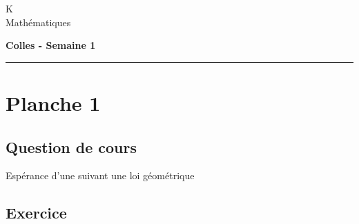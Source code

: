 \documentclass[11pt]{article}%
\begin{document}
\begin{flushleft}
K \\
Mathématiques
\end{flushleft}

\begin{center}
\textbf{\Large{Colles - Semaine 1}}
\end{center}

\hrule

\vspace*{0,2cm}

\section*{Planche 1}
\subsection*{Question de cours}

\noindent
Espérance d'une \var suivant une loi géométrique


\subsection*{Exercice} %
\end{document}
